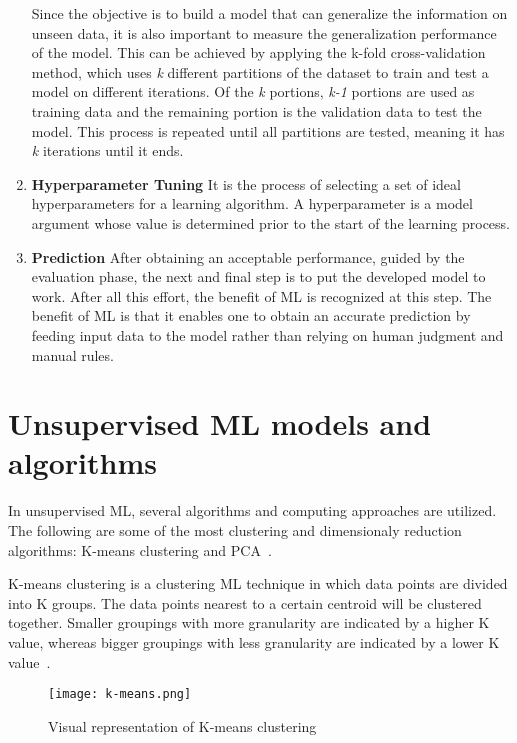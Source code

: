 \begin{enumerate}
    Since the objective is to build a model that can generalize the information on unseen data, it is also important to measure the generalization performance of the model. This can be achieved by applying the k-fold cross-validation method, which uses \textit{k} different partitions of the dataset to train and test a model on different iterations. Of the \textit{k} portions, \textit{k-1} portions are used as training data and the remaining portion is the validation data to test the model. This process is repeated until all partitions are tested, meaning it has \textit{k} iterations until it ends.
    
    \item \textbf{Hyperparameter Tuning} It is the process of selecting a set of ideal hyperparameters for a learning algorithm. A hyperparameter is a model argument whose value is determined prior to the start of the learning process. 
    
    \item \textbf{Prediction} After obtaining an acceptable performance, guided by the evaluation phase, the next and final step is to put the developed model to work. After all this effort, the benefit of \gls{ML} is recognized at this step. The benefit of \gls{ML} is that it enables one to obtain an accurate prediction by feeding input data to the model rather than relying on human judgment and manual rules.

\end{enumerate}

\section{Unsupervised ML models and algorithms}

In unsupervised \gls{ML}, several algorithms and computing approaches are utilized. The following are some of the most clustering and dimensionaly reduction algorithms: K-means clustering and \gls{PCA}~\cite{Chugh2018TypesKnow}.

K-means clustering is a clustering \gls{ML} technique in which data points are divided into K groups. The data points nearest to a certain centroid will be clustered together. Smaller groupings with more granularity are indicated by a higher K value, whereas bigger groupings with less granularity are indicated by a lower K value~\cite{2020WhatIBMb}.
    
\begin{figure}[htbp]
    \centering
    \texttt{[image: k-means.png]}
    \caption{Visual representation of K-means clustering~\cite{Beaumont2020ImageMedium}}
    \label{fig:k-means}
\end{figure}

